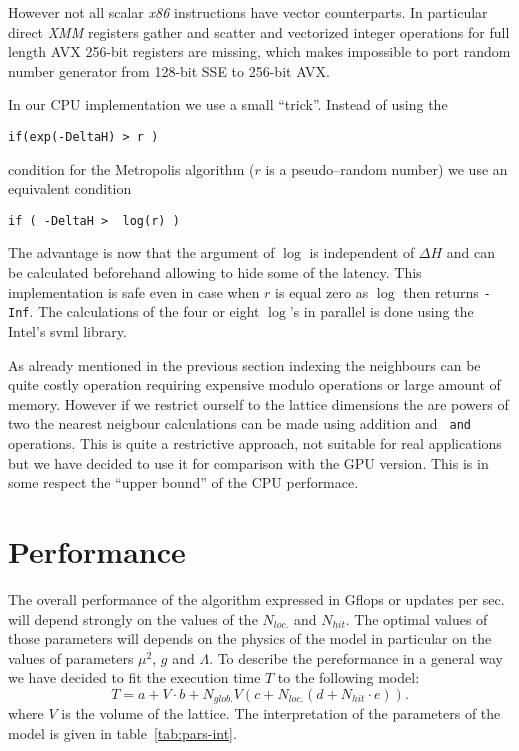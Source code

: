\documentclass[a4paper]{llncs}
\begin{document}
However not all scalar \emph{x86} instructions
have vector counterparts.  In particular direct \emph{XMM} registers
gather and scatter and vectorized integer operations for full length
AVX 256-bit registers are missing, which makes impossible to port
random number generator from 128-bit SSE to 256-bit AVX.

In our CPU implementation we use a small ``trick''. Instead of using the 
\begin{lstlisting}
if(exp(-DeltaH) > r )
\end{lstlisting}
condition for the Metropolis algorithm ($r$ is a pseudo--random number) we use an equivalent
condition 
\begin{lstlisting}
if ( -DeltaH >  log(r) )
\end{lstlisting}
The advantage is now that the argument of $\log$ is independent of
$\Delta H$ and can be calculated beforehand allowing to hide some of
the latency. This implementation is safe even in case when $r$ is
equal zero as $\log$ then returns {\tt -Inf}.  The calculations of the
four or eight $\log$'s in parallel is done using the Intel's svml
library.

As already mentioned in the previous section indexing the neighbours
can be quite costly operation requiring expensive modulo
operations or large amount of memory. However if
we restrict ourself to the lattice dimensions the are powers of two
the nearest neigbour calculations can be made using addition and {\tt
  and} operations. This is quite a restrictive approach, not suitable
for real applications but we have decided to use it for comparison
with the GPU version. This is in some respect the ``upper bound'' of
the CPU performace.


\section{Performance}
\label{sec:performance}


The overall performance of the algorithm expressed in Gflops or
updates per sec. will depend strongly on the values of the $N_{loc.}$
and $N_{hit}$. The optimal values of those parameters will depends on
the physics of the model in particular on the values of parameters
$\mu^2$, $g$ and $\Lambda$. To describe the pereformance in a general
way we have decided to fit the execution time $T$ to the following
model:
\begin{equation}\label{eq:model}
T  = a+ V \cdot b +
N_{glob.} V \left(c + N_{loc.}\left(d + N_{hit}\cdot e\right)\right) . 
\end{equation}
where $V$ is the volume of the lattice.  The interpretation of the
parameters of the model is given in table~\ref{tab:pars-int}.
\end{document}
